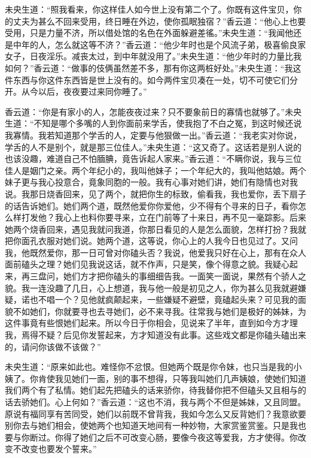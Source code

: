 \documentclass[a4paper,12pt,UTF8,twoside]{ctexbook}
\begin{document}
未央生道：“照我看来，你这样佳人如今世上没有第二个了。你既有这件宝贝，你的丈夫为甚么不回来受用，终日睡在外边，使你孤眠独宿？”香云道：“他心上也要受用，只是力量不济，所以借处馆的名色在外面躲避差徭。”未央生道：“我闻他还是中年的人，怎么就这等不济？”香云道：“他少年时也是个风流子弟，极喜偷良家女子，日夜淫乐。减丧太过，到中年就没用了。”未央生道：“他少年时的力量比我如何？”香云道：“做事的伎俩虽然差不多，那有你这两桩好处。”未央生道：“我这件东西与你这件东西皆是世上没有的。如今两件宝贝凑在一处，切不可使它们分开。从今以后，夜夜要过来同你睡了。”

香云道：“你是有家小的人，怎能夜夜过来？只不要象前日的寡情也就够了。”未央生道：“不知是哪个多嘴的人到你面前来学舌，使我抱了不白之冤，到这时候还说我寡情。我若知道那个学舌的人，定要与他狠做一出。”香云道：“我老实对你说，学舌的人不是别个，就是那三位佳人。”未央生道：“这又奇了。这话若是别人说的也该没趣，难道自己不怕腼腆，竟告诉起人家来。”香云道：“不瞒你说，我与三位佳人是姻门之亲。两个年纪小的，我叫他妹子；一个年纪大的，我叫他姑娘。两个妹子更与我心投意合，竟象同胞的一般。我有心事对她们讲，她们有隐情也对我说。我那日烧香回来，见了两个，就把你生的标致，偷看我，我也爱你，丢下扇子的话告诉她们。她们两个道，既然他爱你你爱他，少不得有个寻来的日子，看你怎么样打发他？我心上也料你要寻来，立在门前等了十来日，再不见一毫踪影。后来她两个烧香回来，遇见我就问我道，你那日看见的人是怎么面貌，怎样打扮？我就把你面孔衣服对她们说。她两个道，这等说，你心上的人我今日也见过了。又问我，他既然爱你，那一日可曾对你磕头否？我说，他爱我只好在心上，那有在众人面前磕头之理？她们见我说这话，就不作声，只是笑，像个得意之貌。我疑心起来，再三盘问，她们方才把你磕头的事细细告我。一面笑一面说，果然有个骄人之貌。我一连没趣了几日，心上想道，我与他一般是初见之人，你为甚么见我就避嫌疑，诺也不唱一个？见他就疯颠起来，一些嫌疑不避壁，竟磕起头来？可见我的面貌不如她们，你就要寻也去寻她们，必不来寻我。往常我与她们是极好的姊妹，为这件事竟有些恨她们起来。所以今日于你相会，见说来了半年，直到如今方才理我，焉得不疑？后见你发誓起来，方才知道没有此事。这些戏文都是你磕头磕出来的，请问你该做不该做？”

未央生道：“原来如此也。难怪你不忿恨。但她两个既是你令妹，也只当是我的小姨了。你肯使我见她们一面，别的事不想得，只等我叫她们几声姨娘，使她们知道我们两个有了私情。她们起先把磕头的话来骄你，待我替你把不但磕头又且相与的话去骄她们。心上何如？”香云道：“这也不消，我与两个不但是姊妹，又且同盟。原说有福同享有苦同受，她们以前既不曾背我，我如今怎么又反背她们？我意欲要别你去与她们相会，使她两个也知道天地间有一种妙物，大家赏鉴赏鉴。只是我也要与你断过。你得了她们之后不可改变心肠，要像今夜这等爱我，方才使得。你改变不改变也要发个誓来。”
\end{document}

